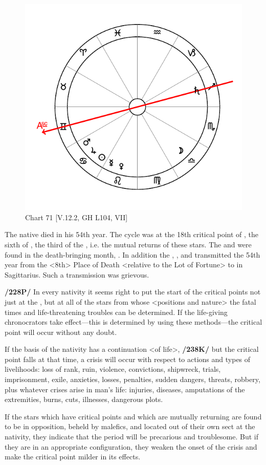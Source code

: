 \begin{figure}
\centering
\vspace{-20pt}
\includegraphics[width=.68\textwidth]{charts/5_12_2}
\caption{Chart 71 [V.12.2, GH L104, VII]}
\label{fig:chart71}
\end{figure}

The native died in his 54th year. The cycle was at the 18th critical point of \Saturn, the sixth of \Jupiter, the third of the \Sun, i.e. the mutual returns of these stars. The \Sun\xspace and \Jupiter\xspace
were found in the death-bringing month, \Sagittarius. In addition the \Sun, \Jupiter, and \Mars\xspace transmitted the 54th year from the <8th> Place of Death <relative to the Lot of Fortune> to \Saturn\xspace in Sagittarius. Such a transmission was grievous.

\textbf{/228P/} In every nativity it seems right to put the start of the critical points not just at the \Moon, but at all of the stars from whose <positions and nature> the fatal times and life-threatening troubles can be determined. If the life-giving chronocrators take effect—this is determined by using these methods—the critical point will occur without any doubt. 

If the basis of the nativity has a continuation <of life>, \textbf{/238K/} but the critical point falls at that time, a crisis will occur with respect to actions and types of livelihoods: loss of rank, ruin, violence, convictions, shipwreck, trials, imprisonment, exile, anxieties, losses,
penalties, sudden dangers, threats, robbery, plus whatever crises arise in man’s life: injuries, diseases, amputations of the extremities, burns, cuts, illnesses, dangerous plots. 

If the stars which have critical points and which are mutually returning are found to be in opposition, beheld by malefics, and located out
of their own sect at the nativity, they indicate that the period will be precarious and troublesome. But if they are in an appropriate configuration, they weaken the onset of the crisis and make the critical point milder in its effects. 

